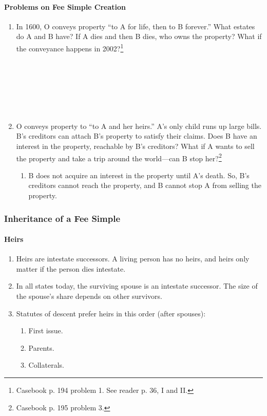 \paragraph{Problems on Fee Simple Creation}

\begin{enumerate}
    \item In 1600, O conveys property ``to A for life, then to B forever.'' 
    What estates do A and B have? If A dies and then B dies, who owns the 
    property? What if the conveyance happens in 2002?\footnote{Casebook p. 194 
    problem 1. See reader p. 36, I and II.} %
    ~\\\\\\\\\\\\\\
    \item O conveys property to ``to A and her heirs.'' A's only child runs up 
    large bills. B's creditors can attach B's property to satisfy their 
    claims. Does B have an interest in the property, reachable by B's 
    creditors? What if A wants to sell the property and take a trip around the 
    world---can B stop her?\footnote{Casebook p. 195 problem 3.} %
    \begin{enumerate}
        \item B does not acquire an interest in the property until A's death. 
        So, B's creditors cannot reach the property, and B cannot stop A from 
        selling the property.
    \end{enumerate}

\end{enumerate}

\subsubsection{Inheritance of a Fee Simple}

\paragraph{Heirs}

\begin{enumerate}
    \item Heirs are intestate successors. A living person has no heirs, and 
    heirs only matter if the person dies intestate.
    \item In all states today, the surviving spouse is an intestate successor. 
    The size of the spouse's share depends on other survivors.
    \item Statutes of descent prefer heirs in this order (after spouses):
    \begin{enumerate}
        \item First issue.
        \item Parents.
        \item Collaterals.
    \end{enumerate}
\end{enumerate}

